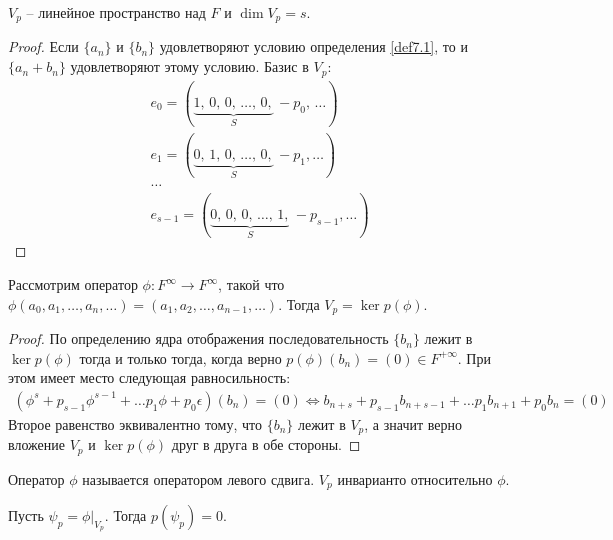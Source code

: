 \begin{proposition}
    $V_p$ -- линейное пространство над $F$ и $\dim V_p = s$.
\end{proposition}

\begin{proof}
    Если $\{a_n\}$ и $\{ b_n \}$ удовлетворяют условию определения \ref{def7.1}, 
    то и $\{a_n + b_n\}$ удовлетворяют этому условию.
    Базис в $V_p$:
    \begin{gather*}
        e_0 = (\underbrace{1,\, 0,\, 0,\, \dots,\, 0,}_{S}\, -p_0,\, \dots) \\
        e_1 = (\underbrace{0,\, 1,\, 0,\, \dots,\, 0,}_{S}\, -p_1, \dots) \\
        \dots \\
        e_{s-1} = (\underbrace{0,\, 0,\, 0,\, \dots,\, 1,}_{S}\, -p_{s-1}, \dots)
    \end{gather*}
\end{proof}

\begin{proposition}
    \label{pr7.2}
    Рассмотрим оператор $\phi: F^{\infty} \to F^{\infty}$, такой что 
    $\phi(a_0, a_1, \dots, a_n, \dots) = (a_1, a_2, \dots, a_{n-1}, \dots)$. 
    Тогда $V_p = \ker p(\phi)$.
\end{proposition}

\begin{proof}
    По определению ядра отображения последовательность $\{b_n\}$ лежит в $\ker p(\phi)$ тогда 
    и только тогда, когда верно $p(\phi) (b_n) = (0) \in F^{+\infty}$. При этом имеет место 
    следующая равносильность:
    \begin{eqnarray*}
        (\phi^s + p_{s-1} \phi^{s-1} + \dots p_1 \phi + p_0 \epsilon) (b_n) = (0) \Leftrightarrow
        b_{n+s} + p_{s-1} b_{n+s-1} + \dots p_1 b_{n+1} + p_0 b_n = (0)
    \end{eqnarray*}
    Второе равенство эквивалентно тому, что $\{b_n\}$ лежит в $V_p$, а значит верно вложение $V_p$ и 
    $\ker p(\phi)$ друг в друга в обе стороны.
\end{proof}

\begin{note}
    Оператор $\phi$ называется оператором левого сдвига. $V_p$ инварианто относительно $\phi$.
\end{note}

\begin{corollary}
    Пусть $\psi_p = \phi \vert_{V_p}$. Тогда $p(\psi_p) = 0$.
\end{corollary}

